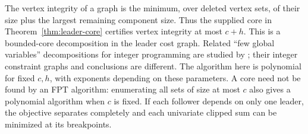 The vertex integrity of a graph is the minimum, over deleted vertex sets, of
their size plus the largest remaining component size. Thus the supplied core
in Theorem~\ref{thm:leader-core} certifies vertex integrity at most \(c+h\).
This is a bounded-core decomposition in the leader cost graph. Related
``few global variables'' decompositions for integer programming are studied
by \citet{DvorakEtAl2021}; their integer constraint graphs and conclusions are
different. The algorithm here is polynomial for fixed \(c,h\), with exponents
depending on these parameters. A core need not be found by an FPT algorithm:
enumerating all sets of size at most \(c\) also gives a polynomial algorithm
when \(c\) is fixed. If each follower depends on only one leader, the objective
separates completely and each univariate clipped sum can be minimized at its
breakpoints.

